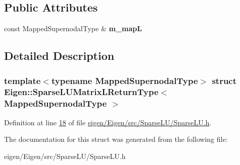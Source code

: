 \subsection*{Public Attributes}
\begin{DoxyCompactItemize}
\item 
\mbox{\label{struct_eigen_1_1_sparse_l_u_matrix_l_return_type_ab3e2a16d98520a46dad44debb71077d4}} 
const Mapped\+Supernodal\+Type \& {\bfseries m\+\_\+mapL}
\end{DoxyCompactItemize}


\subsection{Detailed Description}
\subsubsection*{template$<$typename Mapped\+Supernodal\+Type$>$\newline
struct Eigen\+::\+Sparse\+L\+U\+Matrix\+L\+Return\+Type$<$ Mapped\+Supernodal\+Type $>$}



Definition at line \hyperlink{eigen_2_eigen_2src_2_sparse_l_u_2_sparse_l_u_8h_source_l00018}{18} of file \hyperlink{eigen_2_eigen_2src_2_sparse_l_u_2_sparse_l_u_8h_source}{eigen/\+Eigen/src/\+Sparse\+L\+U/\+Sparse\+L\+U.\+h}.



The documentation for this struct was generated from the following file\+:\begin{DoxyCompactItemize}
\item 
eigen/\+Eigen/src/\+Sparse\+L\+U/\+Sparse\+L\+U.\+h\end{DoxyCompactItemize}

